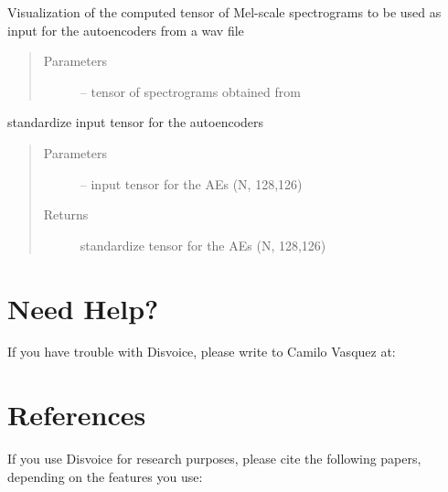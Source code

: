 \documentclass[letterpaper,10pt,english]{sphinxmanual}
\begin{document}
\begin{fulllineitems}
\begin{fulllineitems}
\label{\detokenize{RepLearning:replearning.AEspeech.show_spectrograms}}
Visualization of the computed tensor of Mel-scale spectrograms to be used as input for the autoencoders from a wav file
\begin{quote}\begin{description}
\item[{Parameters}] \leavevmode
{} -- tensor of spectrograms obtained from 

\end{description}\end{quote}

\end{fulllineitems}


\begin{fulllineitems}
\label{\detokenize{RepLearning:replearning.AEspeech.standard}}
standardize input tensor for the autoencoders
\begin{quote}\begin{description}
\item[{Parameters}] \leavevmode
{} -- input tensor for the AEs (N, 128,126)

\item[{Returns}] \leavevmode
standardize tensor for the AEs (N, 128,126)

\end{description}\end{quote}

\end{fulllineitems}


\end{fulllineitems}



\chapter{Need Help?}
\label{\detokenize{help::doc}}\label{\detokenize{help:need-help}}
If you have trouble with Disvoice, please write to Camilo Vasquez at: 


\chapter{References}
\label{\detokenize{reference::doc}}\label{\detokenize{reference:references}}
If you use Disvoice for research purposes, please cite the following papers, depending on the features you use:
\end{document}
